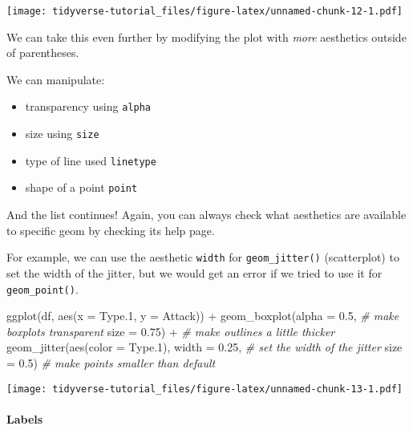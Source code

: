 \documentclass[
]{article}
\newenvironment{Shaded}{\begin{snugshade}}{\end{snugshade}}
\newcommand{\AttributeTok}[1]{\textcolor[rgb]{0.77,0.63,0.00}{#1}}
\newcommand{\CommentTok}[1]{\textcolor[rgb]{0.56,0.35,0.01}{\textit{#1}}}
\newcommand{\FloatTok}[1]{\textcolor[rgb]{0.00,0.00,0.81}{#1}}
\newcommand{\FunctionTok}[1]{\textcolor[rgb]{0.00,0.00,0.00}{#1}}
\newcommand{\NormalTok}[1]{#1}
\newcommand{\SpecialCharTok}[1]{\textcolor[rgb]{0.00,0.00,0.00}{#1}}
\begin{document}
\texttt{[image: tidyverse-tutorial\_files/figure-latex/unnamed-chunk-12-1.pdf]}

We can take this even further by modifying the plot with \emph{more}
aesthetics outside of parentheses.

We can manipulate:

\begin{itemize}
\item
  transparency using \texttt{alpha}
\item
  size using \texttt{size}
\item
  type of line used \texttt{linetype}
\item
  shape of a point \texttt{point}
\end{itemize}

And the list continues! Again, you can always check what aesthetics are
available to specific geom by checking its help page.

For example, we can use the aesthetic \texttt{width} for
\texttt{geom\_jitter()} (scatterplot) to set the width of the jitter,
but we would get an error if we tried to use it for
\texttt{geom\_point()}.

\begin{Shaded}
\begin{Highlighting}[]
\FunctionTok{ggplot}\NormalTok{(df, }\FunctionTok{aes}\NormalTok{(}\AttributeTok{x =}\NormalTok{ Type}\FloatTok{.1}\NormalTok{, }\AttributeTok{y =}\NormalTok{ Attack)) }\SpecialCharTok{+}
  \FunctionTok{geom\_boxplot}\NormalTok{(}\AttributeTok{alpha =} \FloatTok{0.5}\NormalTok{,                     }\CommentTok{\# make boxplots transparent}
               \AttributeTok{size =} \FloatTok{0.75}\NormalTok{) }\SpecialCharTok{+}                   \CommentTok{\# make outlines a little thicker}
  \FunctionTok{geom\_jitter}\NormalTok{(}\FunctionTok{aes}\NormalTok{(}\AttributeTok{color =}\NormalTok{ Type}\FloatTok{.1}\NormalTok{),}
              \AttributeTok{width =} \FloatTok{0.25}\NormalTok{,                     }\CommentTok{\# set the width of the jitter}
              \AttributeTok{size =} \FloatTok{0.5}\NormalTok{)                       }\CommentTok{\# make points smaller than default}
\end{Highlighting}
\end{Shaded}

\texttt{[image: tidyverse-tutorial\_files/figure-latex/unnamed-chunk-13-1.pdf]}

\hypertarget{labels}{%
\paragraph{Labels}\label{labels}}
\end{document}
